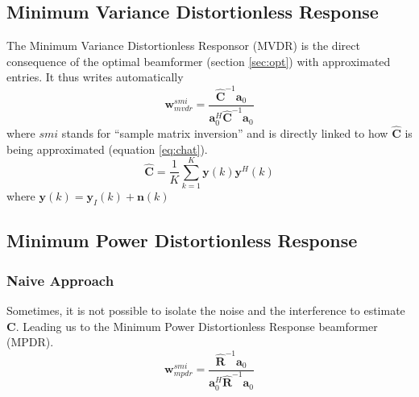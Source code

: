 \documentclass[12pt]{article}
\begin{document}
\subsection{Minimum Variance Distortionless Response}
The Minimum Variance Distortionless Responsor (MVDR) is the direct consequence of the optimal beamformer (section \ref{sec:opt}) with approximated entries. It thus writes automatically
\begin{equation}\label{eq:mvdr}
    \mathbf{w}_{mvdr}^{smi} = \frac{\hat{\mathbf{C}}^{-1}\mathbf{a}_0}{\mathbf{a}_0^H\hat{\mathbf{C}}^{-1}\mathbf{a}_0}
\end{equation}
where $smi$ stands for ``sample matrix inversion'' and is directly linked to how $\hat{\mathbf{C}}$ is being approximated (equation \ref{eq:chat}).
\begin{equation}\label{eq:chat}
    \hat{\mathbf{C}} = \frac{1}{K}\sum_{k=1}^K \mathbf{y}(k)\mathbf{y}^H(k)
\end{equation}
where $\mathbf{y}(k) = \mathbf{y}_I(k)+\mathbf{n}(k)$
\subsection{Minimum Power Distortionless Response}
\subsubsection{Naive Approach}
Sometimes, it is not possible to isolate the noise and the interference to estimate $\mathbf{C}$. Leading us to the Minimum Power Distortionless Response beamformer (MPDR).
\begin{equation}\label{eq:mvdr}
    \mathbf{w}_{mpdr}^{smi} = \frac{\hat{\mathbf{R}}^{-1}\mathbf{a}_0}{\mathbf{a}_0^H\hat{\mathbf{R}}^{-1}\mathbf{a}_0}
\end{equation}
\end{document}
